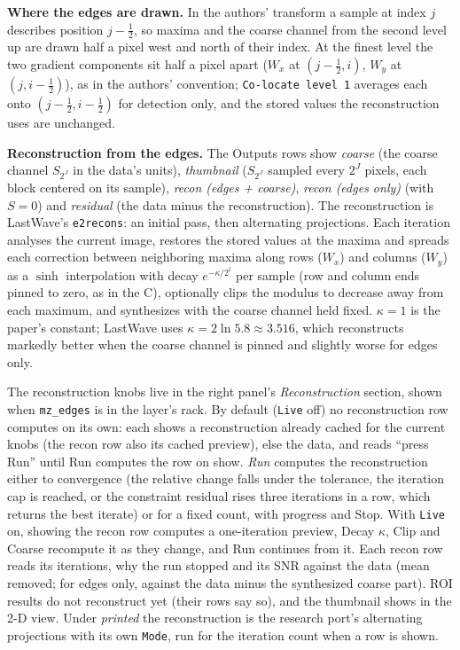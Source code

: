 \documentclass[10pt]{article}
\newcommand{\dev}[1]{\texttt{#1}}
\begin{document}
\textbf{Where the edges are drawn.} In the authors' transform a sample at index $j$ describes
position $j-\frac12$, so maxima and the coarse channel from the second level up are drawn half a
pixel west and north of their index. At the finest level the two gradient components sit half a
pixel apart ($W_x$ at $(j-\frac12, i)$, $W_y$ at $(j, i-\frac12)$), as in the authors' convention;
\texttt{Co-locate level 1} averages each onto $(j-\frac12, i-\frac12)$ for detection only, and the
stored values the reconstruction uses are unchanged.

\textbf{Reconstruction from the edges.} The Outputs rows show \emph{coarse} (the coarse channel
$S_{2^J}$ in the data's units), \emph{thumbnail} ($S_{2^J}$ sampled every $2^J$ pixels, each block
centered on its sample), \emph{recon (edges + coarse)}, \emph{recon (edges only)} (with $S=0$) and
\emph{residual} (the data minus the reconstruction). The reconstruction is LastWave's
\texttt{e2recons}: an initial pass, then alternating projections. Each iteration analyses the
current image, restores the stored values at the maxima and spreads each correction between
neighboring maxima along rows ($W_x$) and columns ($W_y$) as a $\sinh$ interpolation with decay
$e^{-\kappa/2^l}$ per sample (row and column ends pinned to zero, as in the C), optionally clips the
modulus to decrease away from each maximum, and synthesizes with the coarse channel held fixed.
$\kappa=1$ is the paper's constant; LastWave uses $\kappa=2\ln 5.8\approx3.516$, which reconstructs
markedly better when the coarse channel is pinned and slightly worse for edges only.

The reconstruction knobs live in the right panel's \emph{Reconstruction} section, shown when
\dev{mz\_edges} is in the layer's rack. By default (\texttt{Live} off) no reconstruction row
computes on its own: each shows a reconstruction already cached for the current knobs (the recon
row also its cached preview), else the data, and reads ``press Run'' until Run computes the row on
show. \emph{Run} computes the reconstruction either to convergence (the relative change falls under
the tolerance, the iteration cap is reached, or the constraint residual rises three iterations in a
row, which returns the best iterate) or for a fixed count, with progress and Stop. With
\texttt{Live} on, showing the recon row computes a one-iteration preview, Decay $\kappa$, Clip and
Coarse recompute it as they change, and Run continues from it. Each recon row reads its iterations, why the run stopped and
its SNR against the data (mean removed; for edges only, against the data minus the synthesized
coarse part). ROI results do not reconstruct yet (their rows say so), and the thumbnail shows in the
2-D view. Under \emph{printed} the reconstruction is the research port's alternating projections
with its own \texttt{Mode}, run for the iteration count when a row is shown.
\end{document}
